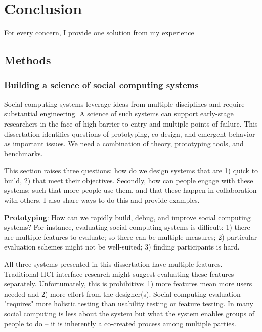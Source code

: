 
\chapter{Conclusion}

For every concern, I provide one solution from my experience

\section{Methods} 

\subsection{Building a science of social computing systems}
Social computing systems leverage ideas from multiple disciplines and require substantial engineering. A science of such systems can support early-stage researchers in the face of high-barrier to entry and multiple points of failure. This dissertation identifies questions of prototyping, co-design, and emergent behavior as important issues. We need a combination of theory, prototyping tools, and benchmarks. 

This section raises three questions: how do we design systems that are 1) quick to build, 2) that meet their objectives. Secondly, how can people engage with these systems: such that more people use them, and that these happen in collaboration with others. I also share ways to do this and provide examples.

\textbf{Prototyping}: How can we rapidly build, debug, and improve social computing systems? For instance, evaluating social computing systems is difficult: 1) there are multiple features to evaluate; so there can be multiple measures; 2) particular evaluation schemes might not be well-suited; 3) finding participants is hard.

All three systems presented in this dissertation have multiple features. Traditional HCI interface research might suggest evaluating these features separately. Unfortumately, this is prohibitive: 1) more features mean more users needed and 2) more effort from the designer(s). Social computing evaluation "requires" more holistic testing than usability testing or feature testing. In many social computing is less about the system but what the system enables groups of people to do -- it is inherently a co-created process among multiple parties. 

